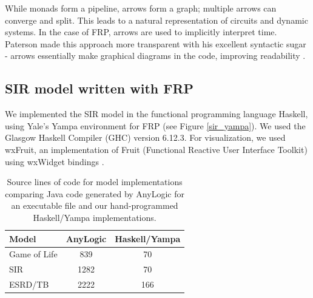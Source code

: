\documentclass{sig-alternate}
\begin{document}
While monads form a pipeline, arrows form a graph; multiple arrows can converge and split. This leads to a natural representation of circuits and dynamic systems. In the case of FRP, arrows are used to implicitly interpret time. Paterson made this approach more transparent with his excellent syntactic sugar - arrows essentially make graphical diagrams in the code, improving readability \cite{PatersonRA:notation}. %

%

\subsection{SIR model written with FRP}

We implemented the SIR model in the functional programming language Haskell, using Yale's Yampa \cite{yampa} environment for FRP (see Figure \ref{sir_yampa}). We used the Glasgow Haskell Compiler (GHC) version 6.12.3. For visualization, we used wxFruit, an implementation of Fruit (Functional Reactive User Interface Toolkit) using wxWidget bindings \cite{fruit, wxfruit}.

\begin{table}[!b]
\caption{Source lines of code for model implementations comparing Java code generated by AnyLogic for an executable file and our hand-programmed Haskell/Yampa implementations.}
\label{table:linecounts1}
\begin{center}
\begin{tabular}{| l || c | c |}
\hline
Model & AnyLogic & Haskell/Yampa  \\
\hline
Game of Life & 839 & 70 \\
SIR & 1282 & 70  \\
ESRD/TB & 2222 & 166 \\
\hline
\end{tabular}
\end{center}
\end{table}
\end{document}
